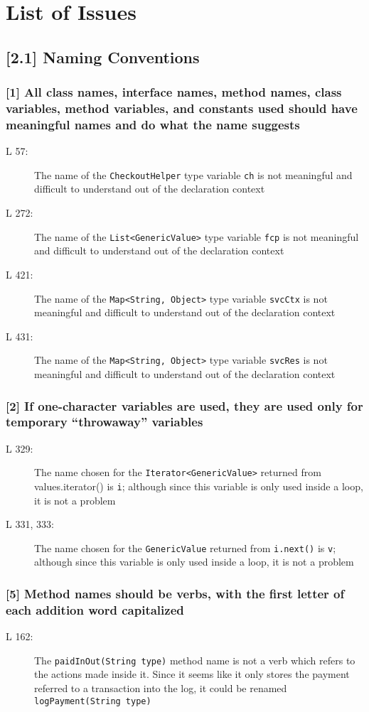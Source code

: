 \section{List of Issues}
\subsection*{[2.1] Naming Conventions}
\subsubsection*{[1] All class names, interface names, method names, class variables, method variables, and constants used should have meaningful names and do what the name suggests}
\begin{description}
	\item[L 57:] The name of the {\tt CheckoutHelper} type variable {\tt ch} is not meaningful and difficult to understand out of the declaration context
	\item[L 272:] The name of the {\tt List<GenericValue>} type variable {\tt fcp} is not meaningful and difficult to understand out of the declaration context
	\item[L 421:] The name of the {\tt Map<String, Object>} type variable {\tt svcCtx} is not meaningful and difficult to understand out of the declaration context
	\item[L 431:] The name of the {\tt Map<String, Object>} type variable {\tt svcRes} is not meaningful and difficult to understand out of the declaration context
\end{description}

\subsubsection*{[2] If one-character variables are used, they are used only for temporary “throwaway” variables}
\begin{description}
	\item[L 329:] The name chosen for the {\tt Iterator<GenericValue>} returned from {values.iterator()} is {\tt i}; although since this variable is only used inside a loop, it is not a problem
	\item[L 331, 333:] The name chosen for the {\tt GenericValue} returned from {\tt i.next()} is {\tt v}; although since this variable is only used inside a loop, it is not a problem
\end{description}

\subsubsection*{[5] Method names should be verbs, with the first letter of each addition word capitalized}
\begin{description}
	\item[L 162:] The {\tt paidInOut(String type)} method name is not a verb which refers to the actions made inside it. Since it seems like it only stores the payment referred to a transaction into the log, it could be renamed {\tt logPayment(String type)}
\end{description}

